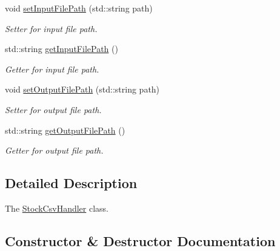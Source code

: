 \begin{DoxyCompactItemize}
void \mbox{\hyperlink{class_stock_csv_handler_af0fa483a54671ac9cf6d14fb7991f3d3}{set\+Input\+File\+Path}} (std\+::string path)
\begin{DoxyCompactList}\small\item\em Setter for input file path. \end{DoxyCompactList}\item 
\mbox{\label{class_stock_csv_handler_a80849f00a57089ea30dde9947af3d4e3}} 
std\+::string \mbox{\hyperlink{class_stock_csv_handler_a80849f00a57089ea30dde9947af3d4e3}{get\+Input\+File\+Path}} ()
\begin{DoxyCompactList}\small\item\em Getter for input file path. \end{DoxyCompactList}\item 
\mbox{\label{class_stock_csv_handler_a99b233b75f7039bfed3cc1a699af942c}} 
void \mbox{\hyperlink{class_stock_csv_handler_a99b233b75f7039bfed3cc1a699af942c}{set\+Output\+File\+Path}} (std\+::string path)
\begin{DoxyCompactList}\small\item\em Setter for output file path. \end{DoxyCompactList}\item 
\mbox{\label{class_stock_csv_handler_aba4991b48238f173ecbe9b29ab850a0a}} 
std\+::string \mbox{\hyperlink{class_stock_csv_handler_aba4991b48238f173ecbe9b29ab850a0a}{get\+Output\+File\+Path}} ()
\begin{DoxyCompactList}\small\item\em Getter for output file path. \end{DoxyCompactList}\end{DoxyCompactItemize}


\subsection{Detailed Description}
The \mbox{\hyperlink{class_stock_csv_handler}{Stock\+Csv\+Handler}} class. 

\subsection{Constructor \& Destructor Documentation}
\mbox{\label{class_stock_csv_handler_a79a39d762f4dd87f82ee927c33f596cc}} 
